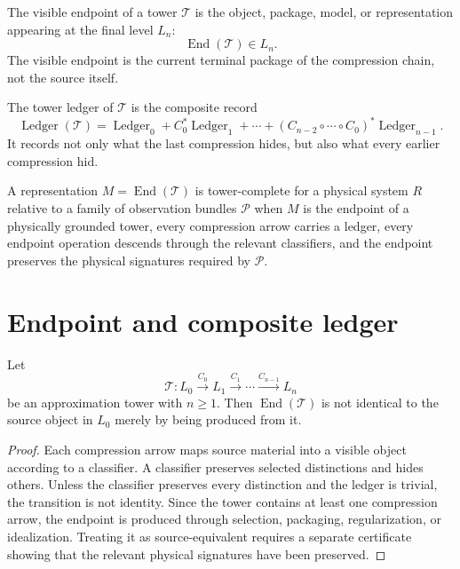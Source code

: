 \begin{definition}
\label{def:visible-endpoint}
The visible endpoint of a tower $\mathcal T$ is the object, package, model, or representation appearing at the final level $L_n$:
$$
\operatorname{End}(\mathcal T)\in L_n.
$$
The visible endpoint is the current terminal package of the compression chain, not the source itself.
\end{definition}

\begin{definition}
\label{def:tower-ledger}
The tower ledger of $\mathcal T$ is the composite record
$$
\operatorname{Ledger}(\mathcal T)
=
\operatorname{Ledger}_0
+
C_0^{*}\operatorname{Ledger}_1
+
\cdots
+
(C_{n-2}\circ\cdots\circ C_0)^{*}\operatorname{Ledger}_{n-1}.
$$
It records not only what the last compression hides, but also what every earlier compression hid.
\end{definition}

\begin{definition}
\label{def:tower-complete-representation}
A representation $M=\operatorname{End}(\mathcal T)$ is tower-complete for a physical system $R$ relative to a family of observation bundles $\mathcal P$ when $M$ is the endpoint of a physically grounded tower, every compression arrow carries a ledger, every endpoint operation descends through the relevant classifiers, and the endpoint preserves the physical signatures required by $\mathcal P$.
\end{definition}

\section{Endpoint and composite ledger}
\label{sec:endpoint-composite-ledger}

\begin{theorem}
\label{thm:endpoint-is-not-source}
Let
$$
\mathcal T:
L_0
\xrightarrow{C_0}
L_1
\xrightarrow{C_1}
\cdots
\xrightarrow{C_{n-1}}
L_n
$$
be an approximation tower with $n\geq 1$. Then $\operatorname{End}(\mathcal T)$ is not identical to the source object in $L_0$ merely by being produced from it.
\end{theorem}

\begin{proof}
Each compression arrow maps source material into a visible object according to a classifier. A classifier preserves selected distinctions and hides others. Unless the classifier preserves every distinction and the ledger is trivial, the transition is not identity. Since the tower contains at least one compression arrow, the endpoint is produced through selection, packaging, regularization, or idealization. Treating it as source-equivalent requires a separate certificate showing that the relevant physical signatures have been preserved.
\end{proof}

